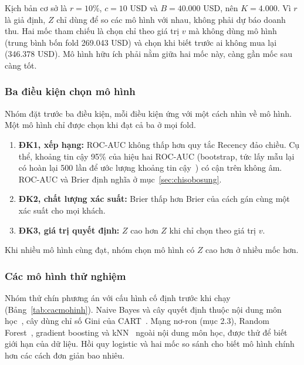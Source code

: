 Kịch bản cơ sở là $r = 10\%$, $c = 10$ USD và $B = 40.000$ USD, nên $K = 4.000$. Vì $r$ là giả định, $Z$ chỉ dùng để so các mô hình với nhau, không phải dự báo doanh thu. Hai mốc tham chiếu là chọn chỉ theo giá trị $v$ mà không dùng mô hình (trung bình bốn fold 269.043 USD) và chọn khi biết trước ai không mua lại (346.378 USD). Mô hình hữu ích phải nằm giữa hai mốc này, càng gần mốc sau càng tốt.

\subsubsection{Ba điều kiện chọn mô hình}\label{sec:chon}
Nhóm đặt trước ba điều kiện, mỗi điều kiện ứng với một cách nhìn về mô hình. Một mô hình chỉ được chọn khi đạt cả ba ở mọi fold.
\begin{enumerate}
    \item \textbf{ĐK1, xếp hạng:} ROC-AUC không thấp hơn quy tắc Recency đảo chiều. Cụ thể, khoảng tin cậy 95\% của hiệu hai ROC-AUC (bootstrap, tức lấy mẫu lại có hoàn lại 500 lần để ước lượng khoảng tin cậy~\cite{efron1993}) có cận trên không âm. ROC-AUC và Brier định nghĩa ở mục~\ref{sec:chisobosung}.
    \item \textbf{ĐK2, chất lượng xác suất:} Brier thấp hơn Brier của cách gán cùng một xác suất cho mọi khách.
    \item \textbf{ĐK3, giá trị quyết định:} $Z$ cao hơn $Z$ khi chỉ chọn theo giá trị $v$.
\end{enumerate}
Khi nhiều mô hình cùng đạt, nhóm chọn mô hình có $Z$ cao hơn ở nhiều mốc hơn.

\subsubsection{Các mô hình thử nghiệm}
Nhóm thử chín phương án với cấu hình cố định trước khi chạy (Bảng~\ref{tab:cacmohinh}). Naive Bayes và cây quyết định thuộc nội dung môn học~\cite{han2011}, cây dùng chỉ số Gini của CART~\cite{hastie2009}. Mạng nơ-ron (mục 2.3), Random Forest~\cite{breiman2001}, gradient boosting và kNN~\cite{hastie2009} ngoài nội dung môn học, được thử để biết giới hạn của dữ liệu. Hồi quy logistic và hai mốc so sánh cho biết mô hình chính hơn các cách đơn giản bao nhiêu.

